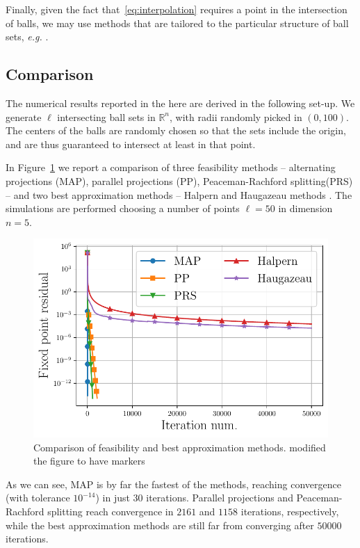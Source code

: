 \documentclass{article}
\newcommand{\R}{\mathbb{R}}
\newcommand{\nicola}[1]{{\color{blue}#1}}
\begin{document}
Finally, given the fact that~\eqref{eq:interpolation} requires a point in the intersection of balls, we may use methods that are tailored to the particular structure of ball sets, \emph{e.g.} \cite{lushchakova_geometric_2020}.

\subsection{Comparison}
The numerical results reported in the here are derived in the following set-up. We generate $\ell$ intersecting ball sets in $\R^n$, with radii randomly picked in $(0, 100)$. The centers of the balls are randomly chosen so that the sets include the origin, and are thus guaranteed to intersect at least in that point.

In Figure~\ref{fig:projection_methods} we report a comparison of three feasibility methods -- alternating projections (MAP), parallel projections (PP), Peaceman-Rachford splitting(PRS) \cite{reich_projection_2015,bauschke_convex_2017} -- and two best approximation methods -- Halpern and Haugazeau methods \cite{bauschke_convex_2017}. The simulations are performed choosing a number of points $\ell = 50$ in dimension $n = 5$.

\begin{figure}[!ht]
\centering
\includegraphics[width = 0.9\columnwidth]{Figures/comparison_projection_methods}
\caption{Comparison of feasibility and best approximation methods. \nicola{modified the figure to have markers}}
\label{fig:projection_methods}
\end{figure}

As we can see, MAP is by far the fastest of the methods, reaching convergence (with tolerance $10^{-14}$) in just $30$ iterations. Parallel projections and Peaceman-Rachford splitting reach convergence in $2161$ and $1158$ iterations, respectively, while the best approximation methods are still far from converging after $50000$ iterations.
\end{document}
